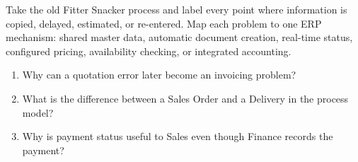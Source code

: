 \begin{tryit}
Take the old Fitter Snacker process and label every point where information is
copied, delayed, estimated, or re-entered. Map each problem to one ERP
mechanism: shared master data, automatic document creation, real-time status,
configured pricing, availability checking, or integrated accounting.
\end{tryit}

\begin{quickcheck}
\begin{enumerate}
  \item Why can a quotation error later become an invoicing problem?
  \item What is the difference between a Sales Order and a Delivery in the process model?
  \item Why is payment status useful to Sales even though Finance records the payment?
\end{enumerate}
\end{quickcheck}
